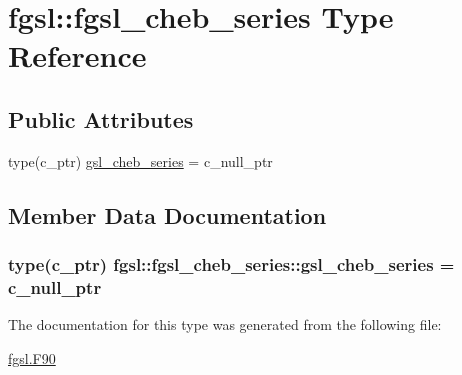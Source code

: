 \hypertarget{structfgsl_1_1fgsl__cheb__series}{}\section{fgsl\+:\+:fgsl\+\_\+cheb\+\_\+series Type Reference}
\label{structfgsl_1_1fgsl__cheb__series}
\subsection*{Public Attributes}
\begin{DoxyCompactItemize}
\item 
type(c\+\_\+ptr) \hyperlink{structfgsl_1_1fgsl__cheb__series_a89c19d0c070d4d0ae5f923df74f69e96}{gsl\+\_\+cheb\+\_\+series} = c\+\_\+null\+\_\+ptr
\end{DoxyCompactItemize}


\subsection{Member Data Documentation}
\hypertarget{structfgsl_1_1fgsl__cheb__series_a89c19d0c070d4d0ae5f923df74f69e96}{}
\subsubsection[{gsl\+\_\+cheb\+\_\+series}]{\setlength{\rightskip}{0pt plus 5cm}type(c\+\_\+ptr) fgsl\+::fgsl\+\_\+cheb\+\_\+series\+::gsl\+\_\+cheb\+\_\+series = c\+\_\+null\+\_\+ptr}\label{structfgsl_1_1fgsl__cheb__series_a89c19d0c070d4d0ae5f923df74f69e96}


The documentation for this type was generated from the following file\+:\begin{DoxyCompactItemize}
\item 
\hyperlink{fgsl_8F90}{fgsl.\+F90}\end{DoxyCompactItemize}
